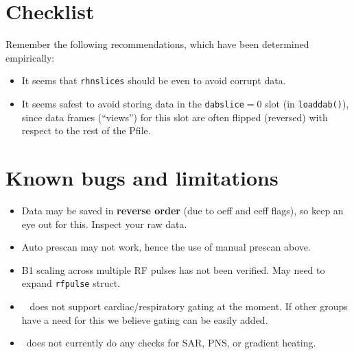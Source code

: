 

\section{Checklist}

Remember the following recommendations, which have been determined empirically:
\begin{itemize}
	\item It seems that {\tt rhnslices} should be even to avoid corrupt data.
	\item It seems safest to avoid storing data in the {\tt dabslice}$=$0 slot (in \texttt{loaddab()}), since data frames (``views'') for this slot are often flipped (reversed) with respect to the rest of the Pfile.
\end{itemize}


\section{Known bugs and limitations}
\begin{itemize}
	\item Data may be saved in \textbf{reverse order} (due to oeff and eeff flags), so keep an eye out for this. Inspect your raw data. %
	\item Auto prescan may not work, hence the use of manual prescan above.
	\item B1 scaling across multiple RF pulses has not been verified. May need to expand \texttt{rfpulse} struct.
	\item \toppe~ does not support cardiac/respiratory gating at the moment. If other groups have a need for this we believe gating can be easily added.
	\item \toppe~does not currently do any checks for SAR, PNS, or gradient heating.
\end{itemize}

